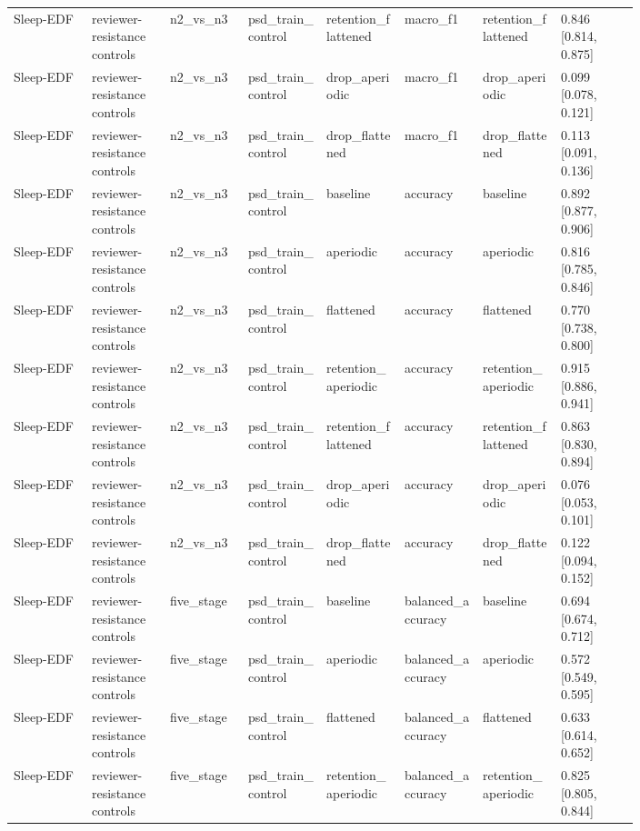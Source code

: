 \begin{longtable}{p{0.10\linewidth}p{0.10\linewidth}p{0.10\linewidth}p{0.10\linewidth}p{0.10\linewidth}p{0.10\linewidth}p{0.10\linewidth}p{0.10\linewidth}}
Sleep-EDF & reviewer-resistance controls & n2\_vs\_n3 & psd\_train\_control & retention\_flattened & macro\_f1 & retention\_flattened & 0.846 [0.814, 0.875]\\
Sleep-EDF & reviewer-resistance controls & n2\_vs\_n3 & psd\_train\_control & drop\_aperiodic & macro\_f1 & drop\_aperiodic & 0.099 [0.078, 0.121]\\
Sleep-EDF & reviewer-resistance controls & n2\_vs\_n3 & psd\_train\_control & drop\_flattened & macro\_f1 & drop\_flattened & 0.113 [0.091, 0.136]\\
Sleep-EDF & reviewer-resistance controls & n2\_vs\_n3 & psd\_train\_control & baseline & accuracy & baseline & 0.892 [0.877, 0.906]\\
Sleep-EDF & reviewer-resistance controls & n2\_vs\_n3 & psd\_train\_control & aperiodic & accuracy & aperiodic & 0.816 [0.785, 0.846]\\
Sleep-EDF & reviewer-resistance controls & n2\_vs\_n3 & psd\_train\_control & flattened & accuracy & flattened & 0.770 [0.738, 0.800]\\
Sleep-EDF & reviewer-resistance controls & n2\_vs\_n3 & psd\_train\_control & retention\_aperiodic & accuracy & retention\_aperiodic & 0.915 [0.886, 0.941]\\
Sleep-EDF & reviewer-resistance controls & n2\_vs\_n3 & psd\_train\_control & retention\_flattened & accuracy & retention\_flattened & 0.863 [0.830, 0.894]\\
Sleep-EDF & reviewer-resistance controls & n2\_vs\_n3 & psd\_train\_control & drop\_aperiodic & accuracy & drop\_aperiodic & 0.076 [0.053, 0.101]\\
Sleep-EDF & reviewer-resistance controls & n2\_vs\_n3 & psd\_train\_control & drop\_flattened & accuracy & drop\_flattened & 0.122 [0.094, 0.152]\\
Sleep-EDF & reviewer-resistance controls & five\_stage & psd\_train\_control & baseline & balanced\_accuracy & baseline & 0.694 [0.674, 0.712]\\
Sleep-EDF & reviewer-resistance controls & five\_stage & psd\_train\_control & aperiodic & balanced\_accuracy & aperiodic & 0.572 [0.549, 0.595]\\
Sleep-EDF & reviewer-resistance controls & five\_stage & psd\_train\_control & flattened & balanced\_accuracy & flattened & 0.633 [0.614, 0.652]\\
Sleep-EDF & reviewer-resistance controls & five\_stage & psd\_train\_control & retention\_aperiodic & balanced\_accuracy & retention\_aperiodic & 0.825 [0.805, 0.844]\\

\end{longtable}
